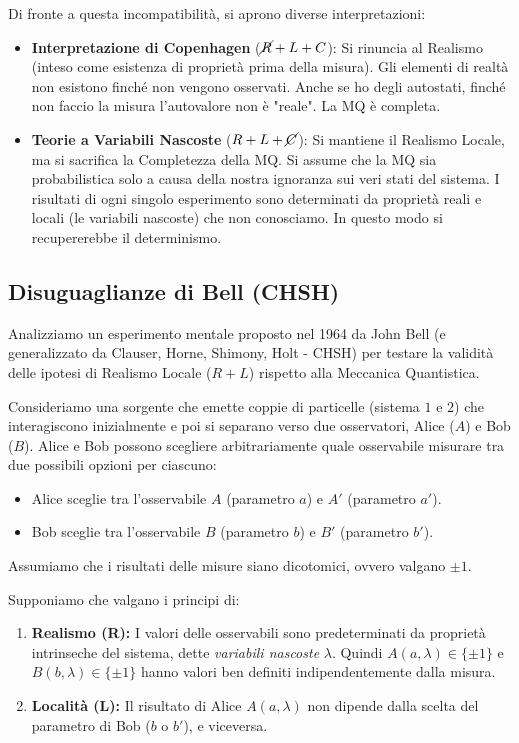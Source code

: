 Di fronte a questa incompatibilità, si aprono diverse interpretazioni:

\begin{itemize}
    \item \textbf{Interpretazione di Copenhagen} (\(\cancel{R} + L + C\)):
    Si rinuncia al Realismo (inteso come esistenza di proprietà prima della misura). Gli elementi di realtà non esistono finché non vengono osservati. Anche se ho degli autostati, finché non faccio la misura l'autovalore non è "reale". La MQ è completa.

    \item \textbf{Teorie a Variabili Nascoste} (\(R + L + \cancel{C}\)):
    Si mantiene il Realismo Locale, ma si sacrifica la Completezza della MQ.
    Si assume che la MQ sia probabilistica solo a causa della nostra ignoranza sui veri stati del sistema.
    I risultati di ogni singolo esperimento sono determinati da proprietà reali e locali (le variabili nascoste) che non conosciamo. In questo modo si recupererebbe il determinismo.
\end{itemize}

\subsection{Disuguaglianze di Bell (CHSH)}

Analizziamo un esperimento mentale proposto nel 1964 da John Bell (e generalizzato da Clauser, Horne, Shimony, Holt - CHSH) per testare la validità delle ipotesi di Realismo Locale ($R+L$) rispetto alla Meccanica Quantistica.

Consideriamo una sorgente che emette coppie di particelle (sistema $1$ e $2$) che interagiscono inizialmente e poi si separano verso due osservatori, Alice ($A$) e Bob ($B$).
Alice e Bob possono scegliere arbitrariamente quale osservabile misurare tra due possibili opzioni per ciascuno:
\begin{itemize}
    \item Alice sceglie tra l'osservabile $A$ (parametro $a$) e $A'$ (parametro $a'$).
    \item Bob sceglie tra l'osservabile $B$ (parametro $b$) e $B'$ (parametro $b'$).
\end{itemize}
Assumiamo che i risultati delle misure siano dicotomici, ovvero valgano $\pm 1$.

Supponiamo che valgano i principi di:
\begin{enumerate}
    \item \textbf{Realismo (R):} I valori delle osservabili sono predeterminati da proprietà intrinseche del sistema, dette \textit{variabili nascoste} $\lambda$. Quindi $A(a, \lambda) \in \{\pm 1\}$ e $B(b, \lambda) \in \{\pm 1\}$ hanno valori ben definiti indipendentemente dalla misura.
    \item \textbf{Località (L):} Il risultato di Alice $A(a, \lambda)$ non dipende dalla scelta del parametro di Bob ($b$ o $b'$), e viceversa.
\end{enumerate}

